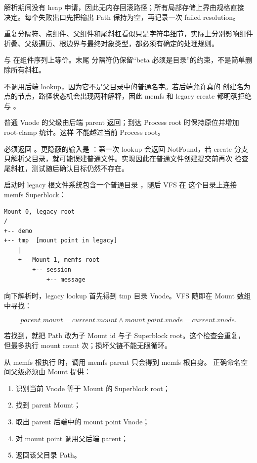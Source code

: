 解析期间没有 heap 申请，因此无内存回滚路径；所有局部存储上界由规格直接
决定。每个失败出口先把输出 Path 保持为空，再记录一次 failed resolution。

重复分隔符、点组件、父组件和尾斜杠看似只是字符串细节，实际上分别影响组件
折叠、父级遍历、根边界与最终对象类型，都必须有确定的处理规则。


 与  在组件序列上等价。末尾
分隔符仍保留“beta 必须是目录”的约束，不是简单删除所有斜杠。


 不调用后端 lookup，因为它不是父目录中的普通名字。若后端允许真的
创建名为点的节点，路径状态机会出现两种解释，因此 memfs 和 legacy create
都明确拒绝  与 。


普通 Vnode 的父级由后端 parent 返回；到达 Process root 时保持原位并增加
root-clamp 统计。这样  不能越过当前 Process root。


 必须返回 。更隐蔽的输入是
：第一次 lookup 会返回 NotFound，若 create
分支只解析父目录，就可能误建普通文件。实现因此在普通文件创建提交前再次
检查尾斜杠，测试随后确认目标仍然不存在。

启动时 legacy 根文件系统包含一个普通目录 ，随后 VFS 在
这个目录上连接 memfs Superblock：

\begin{lstlisting}[caption={当前两层挂载树}]
Mount 0, legacy root
/
+-- demo
+-- tmp  [mount point in legacy]
    |
    +-- Mount 1, memfs root
        +-- session
            +-- message
\end{lstlisting}

向下解析时，legacy lookup 首先得到 tmp 目录 Vnode。VFS 随即在 Mount 数组
中寻找：

\[
  parent\_mount = current.mount
  \land mount\_point.vnode = current.vnode.
\]

若找到，就把 Path 改为子 Mount id 与子 Superblock root。这个检查会重复，
但最多执行 mount count 次；损坏父链不能无限循环。

从 memfs 根执行  时，调用 memfs parent 只会得到 memfs 根自身。
正确命名空间父级必须由 Mount 提供：

\begin{enumerate}
  \item 识别当前 Vnode 等于 Mount 的 Superblock root；
  \item 找到 parent Mount；
  \item 取出 parent 后端中的 mount point Vnode；
  \item 对 mount point 调用父后端 parent；
  \item 返回该父目录 Path。
\end{enumerate}

